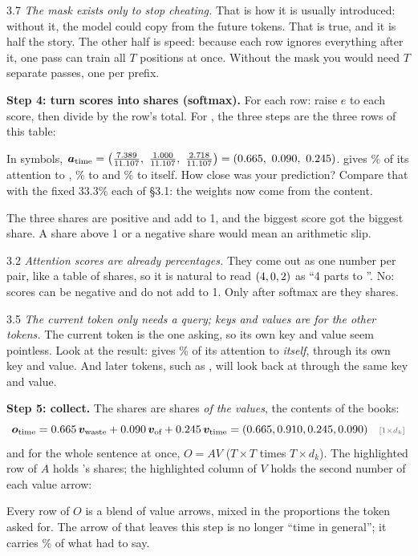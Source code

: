 \begin{wrongidea}{3.7}
\emph{The mask exists only to stop cheating.} That is how it is usually introduced: without it, the model
could copy from the future tokens. That is true, and it is half the story. The other half
is speed: because each row ignores everything after it, one pass can train all $T$ positions at once. Without
the mask you would need $T$ separate passes, one per prefix.
\end{wrongidea}

\textbf{Step 4: turn scores into shares (softmax).} For each row: raise $e$ to each score, then divide by the
row's total. For , the three steps are the three rows of this table:
\begin{center}\end{center}
In symbols, $\bm{a}_{\text{time}} = \left(\tfrac{\eWaste}{\eSum},\ \tfrac{\eOf}{\eSum},\ \tfrac{\eTime}{\eSum}\right)
= (\aWaste,\ \aOf,\ \aTime)$.
 gives \apctWaste\% of its attention to , \apctOf\% to  and \apctTime\% to itself.
How close was your prediction? Compare that with the fixed 33.3\% each of \S3.1: the weights now come from the
content.

\Sanity The three shares are positive and add to 1, and the biggest score got the biggest share. A share above 1
or a negative share would mean an arithmetic slip.

\begin{wrongidea}{3.2}
\emph{Attention scores are already percentages.} They come out as one number per pair, like a table of shares, so
it is natural to read $(4,0,2)$ as ``4 parts to ''. No: scores can be negative and do not add to 1. Only after
softmax are they shares.
\end{wrongidea}

\begin{wrongidea}{3.5}
\emph{The current token only needs a query; keys and values are for the other tokens.} The current token is the
one asking, so its own key and value seem pointless.
Look at the result:  gives \apctTime\% of its attention to \emph{itself}, through its own key and value.
And later tokens, such as , will look back at  through the same key and value.
\end{wrongidea}

\textbf{Step 5: collect.} The shares are shares \emph{of the values}, the contents of the books:
\[
\bm{o}_{\text{time}} = \aWaste\,\bm{v}_{\text{waste}} + \aOf\,\bm{v}_{\text{of}} + \aTime\,\bm{v}_{\text{time}}
= \oTime \shape{1\times d_k}
\]
and for the whole sentence at once, $O=AV$ ($T\times T$ times $T\times d_k$). The highlighted row of $A$ holds
's shares; the highlighted column of $V$ holds the second number of each value arrow:
\begin{center}\resizebox{\linewidth}{!}{}\end{center}
Every row of $O$ is a blend of value arrows, mixed in the proportions the token asked for. The arrow of 
that leaves this step is no longer ``time in general''; it carries \apctWaste\% of what  had to say.

